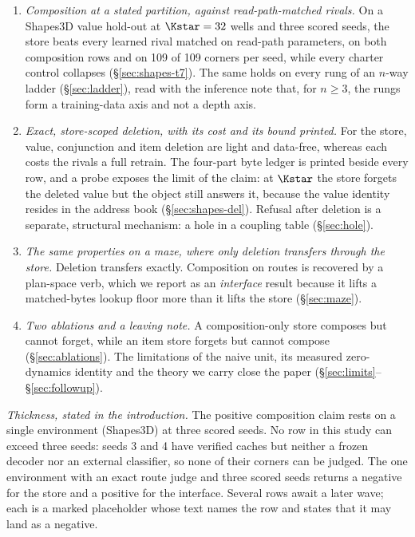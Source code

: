 \begin{enumerate}[leftmargin=*,itemsep=2pt]
\item \emph{Composition at a stated partition, against read-path-matched rivals.} On a
  Shapes3D value hold-out at $\Kstar=32$ wells and three scored seeds, the store beats every %
  learned rival matched on read-path parameters, on both composition rows and on 109 of 109 %
  corners per seed, while every charter control collapses
  (\S\ref{sec:shapes-t7}). The same holds on every rung of an $n$-way ladder
  (\S\ref{sec:ladder}), read with the inference note that, for $n\ge3$, the rungs form a
  training-data axis and not a depth axis.
\item \emph{Exact, store-scoped deletion, with its cost and its bound printed.} For the store,
  value, conjunction and item deletion are light and data-free, whereas each costs the rivals a
  full retrain. The four-part byte ledger is printed beside every row, and a probe exposes the
  limit of the claim: at $\Kstar$ the store forgets the deleted value but the object still
  answers it, because the value identity resides in the address book (\S\ref{sec:shapes-del}).
  Refusal after deletion is a separate, structural mechanism: a hole in a coupling table
  (\S\ref{sec:hole}).
\item \emph{The same properties on a maze, where only deletion transfers through the
  store.} Deletion transfers exactly. Composition on routes is recovered by a plan-space verb,
  which we report as an \emph{interface} result because it lifts a matched-bytes lookup
  floor more than it lifts the store (\S\ref{sec:maze}).
\item \emph{Two ablations and a leaving note.} A composition-only store composes but cannot
  forget, while an item store forgets but cannot compose (\S\ref{sec:ablations}). The
  limitations of the naive unit, its measured zero-dynamics identity and the theory we carry
  close the paper (\S\ref{sec:limits}--\S\ref{sec:followup}).
\end{enumerate}

\noindent\emph{Thickness, stated in the introduction.} The positive composition claim rests
on a single environment (Shapes3D) at three scored seeds. No row in this study can exceed three
seeds: seeds 3 and 4 have verified caches but neither a frozen decoder nor an external
classifier, so none of their corners can be judged. %
The one environment with an exact route judge and three scored seeds returns a negative for
the store and a positive for the interface. Several rows await a later wave; each is a
marked placeholder whose text names the row and states that it may land as a negative.
